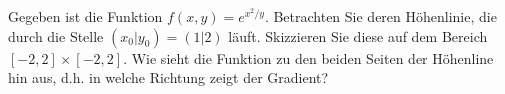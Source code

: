 \item 
Gegeben ist die Funktion $f(x,y) = e^{x^2 / y}$.
Betrachten Sie deren Höhenlinie, die durch die Stelle $(x_0|y_0)=(1|2)$ läuft. Skizzieren Sie diese auf dem Bereich $[-2,2]\times[-2,2]$.
Wie sieht die Funktion zu den beiden Seiten der Höhenline hin aus, d.h. in welche Richtung zeigt der Gradient?

